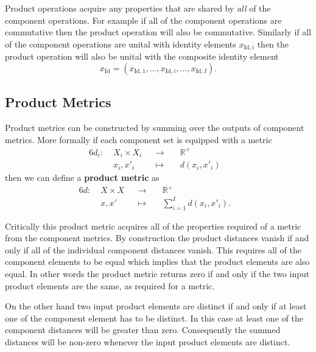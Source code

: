 \documentclass[
  letterpaper,
  DIV=11,
  numbers=noendperiod]{scrartcl}
\begin{document}
Product operations acquire any properties that are shared by \emph{all}
of the component operations. For example if all of the component
operations are commutative then the product operation will also be
commutative. Similarly if all of the component operations are unital
with identity elements \(x_{\text{Id}, i}\) then the product operation
will also be unital with the composite identity element \[
x_{\text{Id}} = (x_{\text{Id}, 1}, \ldots,
                 x_{\text{Id}, i}, \ldots,
                 x_{\text{Id}, I}).
\]

\hypertarget{product-metrics}{%
\subsection{Product Metrics}\label{product-metrics}}

Product metrics can be constructed by summing over the outputs of
component metrics. More formally if each component set is equipped with
a metric \begin{alignat*}{6}
d_{i} :\; & X_{i} \times X_{i}& &\rightarrow& \; & \mathbb{R}^{+} &
\\
& x_{i}, x'_{i} & &\mapsto& & d(x_{i}, x'_{i}) &
\end{alignat*} then we can define a \textbf{product metric} as
\begin{alignat*}{6}
d :\; & X \times X& &\rightarrow& \; & \mathbb{R}^{+} &
\\
& x, x' & &\mapsto& & \sum_{i = 1}^{I} d(x_{i}, x'_{i}). &
\end{alignat*}

Critically this product metric acquires all of the properties required
of a metric from the component metrics. By construction the product
distances vanish if and only if all of the individual component
distances vanish. This requires all of the component elements to be
equal which implies that the product elements are also equal. In other
words the product metric returns zero if and only if the two input
product elements are the same, as required for a metric.

On the other hand two input product elements are distinct if and only if
at least one of the component element has to be distinct. In this case
at least one of the component distances will be greater than zero.
Consequently the summed distances will be non-zero whenever the input
product elements are distinct.
\end{document}
